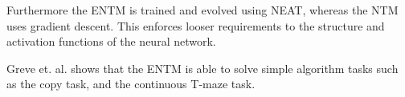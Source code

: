 \newpar Furthermore the ENTM is trained and evolved using NEAT, whereas the NTM uses gradient descent. This enforces looser requirements to the structure and activation functions of the neural network.

\newpar Greve et. al. shows that the ENTM is able to solve simple algorithm tasks such as the copy task, and the continuous T-maze task.

